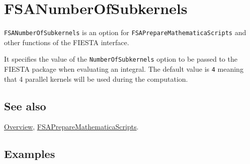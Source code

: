 \documentclass[../FeynHelpersManual.tex]{subfiles}
\begin{document}
\begin{Shaded}
\begin{Highlighting}[]
 
\end{Highlighting}
\end{Shaded}

\hypertarget{fsanumberofsubkernels}{
\section{FSANumberOfSubkernels}\label{fsanumberofsubkernels}}

\texttt{FSANumberOfSubkernels} is an option for
\texttt{FSAPrepareMathematicaScripts} and other functions of the FIESTA
interface.

It specifies the value of the \texttt{NumberOfSubkernels} option to be
passed to the FIESTA package when evaluating an integral. The default
value is \texttt{4} meaning that 4 parallel kernels will be used during
the computation.

\subsection{See also}

\hyperlink{toc}{Overview},
\hyperlink{fsapreparemathematicascripts}{FSAPrepareMathematicaScripts}.

\subsection{Examples}
\end{document}

